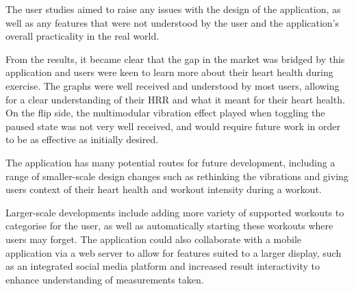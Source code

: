 \documentclass{l4proj}
\begin{document}
The user studies aimed to raise any issues with the design of the application, as well as any features that were not understood by the user and the application’s overall practicality in the real world.

From the results, it became clear that the gap in the market was bridged by this application and users were keen to learn more about their heart health during exercise. The graphs were well received and understood by most users, allowing for a clear understanding of their HRR and what it meant for their heart health. On the flip side, the multimodular vibration effect played when toggling the paused state was not very well received, and would require future work in order to be as effective as initially desired.

The application has many potential routes for future development, including a range of smaller-scale design changes such as rethinking the vibrations and giving users context of their heart health and workout intensity during a workout.

Larger-scale developments include adding more variety of supported workouts to categorise for the user, as well as automatically starting these workouts where users may forget. The application could also collaborate with a mobile application via a web server to allow for features suited to a larger display, such as an integrated social media platform and increased result interactivity to enhance understanding of measurements taken.

%
% 
\end{document}

